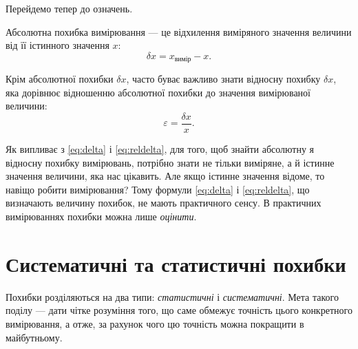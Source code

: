 \documentclass{LabBook}
\begin{document}
Перейдемо тепер до означень.

Абсолютна похибка вимірювання --- це відхилення виміряного значення величини від її істинного значення $x$:
\begin{equation}\label{eq:delta}
  \delta x = x_\text{вимір} - x.
\end{equation}

Крім абсолютної похибки $\delta x$, часто буває важливо знати відносну похибку $\delta x$, яка дорівнює відношенню
абсолютної похибки до значення вимірюваної величини:
\begin{equation}\label{eq:reldelta}
  \varepsilon = \frac{\delta x}{x}.
\end{equation}

Як випливає з \eqref{eq:delta} і \eqref{eq:reldelta}, для того, щоб знайти абсолютну я відносну похибку вимірювань, потрібно знати не тільки виміряне, а й істинне значення величини, яка нас цікавить. Але якщо істинне значення відоме, то навіщо робити вимірювання? Тому формули \eqref{eq:delta} і \eqref{eq:reldelta}, що визначають величину похибок, не мають практичного сенсу. В практичних вимірюваннях похибки можна лише \emph{оцінити}.


%
%
%

\chapter{Систематичні та статистичні похибки}


Похибки розділяються на два типи: \emph{статистичні} і \emph{систематичні}. Мета такого поділу --- дати чітке розуміння того, що саме обмежує точність цього конкретного вимірювання, а отже, за рахунок чого цю точність можна покращити в майбутньому.
\end{document}
